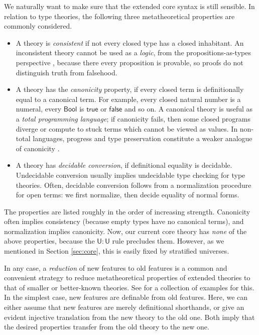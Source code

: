 \documentclass[acmsmall,screen,dvipsnames]{acmart}\settopmatter{}
\renewcommand{\U}{\mathsf{U}}
\newcommand{\true}{\mathsf{true}}
\newcommand{\false}{\mathsf{false}}
\theoremstyle{remark}
\begin{document}
We naturally want to make sure that the extended core syntax is still sensible.
In relation to type theories, the following three metatheoretical properties are
commonly considered.
\begin{itemize}
  \item A theory is \emph{consistent} if not every closed type has a closed
    inhabitant. An inconsistent theory cannot be used as a \emph{logic}, from
    the propositions-as-types perspective \cite[Chapter~1]{hottbook}, because
    there every proposition is provable, so proofs do not distinguish truth from
    falsehood.
  \item A theory has the \emph{canonicity} property, if every closed term is
    definitionally equal to a canonical term. For example, every closed natural
    number is a numeral, every $\mathsf{Bool}$ is $\true$ or $\false$ and so
    on. A canonical theory is useful as a \emph{total programming language}; if
    canonicity fails, then some closed programs diverge or compute to stuck
    terms which cannot be viewed as values. In non-total languages, progress and
    type preservation constitute a weaker analogue of canonicity
    \cite[Chapter~6]{harper2016practical}.
  \item A theory has \emph{decidable conversion}, if definitional equality is
    decidable. Undecidable conversion usually implies undecidable type checking
    for type theories. Often, decidable conversion follows from a normalization
    procedure for open terms: we first normalize, then decide equality of normal
    forms.
\end{itemize}


The properties are listed roughly in the order of increasing
strength. Canonicity often implies consistency (because empty types have no
canonical terms), and normalization implies canonicity. Now, our current core
theory has \emph{none} of the above properties, because the $\U : \U$ rule
precludes them. However, as we mentioned in Section \ref{sec:core}, this is
easily fixed by stratified universes.

In any case, a \emph{reduction} of new features to old features is a common and
convenient strategy to reduce metatheoretical properties of extended theories to
that of smaller or better-known theories. See \citet{next700} for a collection
of examples for this. In the simplest case, new features are definable from old
features. Here, we can either assume that new features are merely definitional
shorthands, or give an evident injective translation from the new theory to the
old one. Both imply that the desired properties transfer from the old theory to
the new one.
\end{document}
